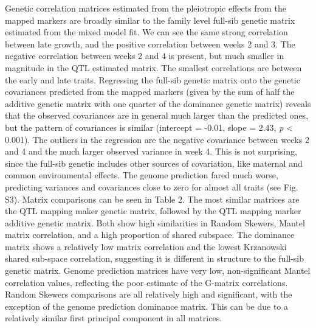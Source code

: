 \begin{refsection}
Genetic correlation matrices estimated from the pleiotropic effects from
the mapped markers are broadly similar to the family level full-sib
genetic matrix estimated from the mixed model fit. We can see the same strong
correlation between late growth, and the positive correlation between
weeks 2 and 3. The negative correlation between weeks 2 and 4 is
present, but much smaller in magnitude in the QTL estimated matrix. The
smallest correlations are between the early and late traits. Regressing
the full-sib genetic matrix onto the genetic covariances predicted from the
mapped markers (given by the sum of half the additive genetic matrix
with one quarter of the dominance genetic matrix) reveals that the
observed covariances are in general much larger than the predicted ones,
but the pattern of covariances is similar (intercept = -0.01, slope =
2.43, \emph{p} \textless{} 0.001). The outliers in the regression are
the negative covariance between weeks 2 and 4 and the much larger
observed variance in week 4. This is not surprising, since the full-sib
genetic includes other sources of covariation, like maternal and common
environmental effects. The genome prediction fared much worse,
predicting variances and covariances close to zero for almost all traits
(see Fig. S3). Matrix comparisons can be seen in Table 2. The most
similar matrices are the QTL mapping maker genetic matrix, followed by
the QTL mapping marker additive genetic matrix. Both show high
similarities in Random Skewers, Mantel matrix correlation, and a high
proportion of shared subspace. The dominance matrix shows a relatively
low matrix correlation and the lowest Krzanowski shared sub-space
correlation, suggesting it is different in structure to the full-sib
genetic matrix. Genome prediction matrices have very low, non-significant
Mantel correlation values, reflecting the poor estimate of the G-matrix
correlations. Random Skewers comparisons are all relatively high and
significant, with the exception of the genome prediction dominance
matrix. This can be due to a relatively similar first principal
component in all matrices.


\end{refsection}
